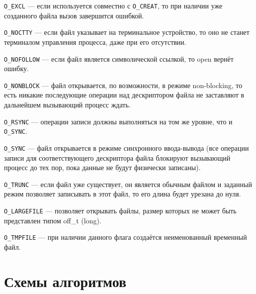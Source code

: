 \documentclass[12pt]{report}
\begin{document}
\texttt{O\_EXCL} --- если используется совместно с \texttt{O\_CREAT}, то при наличии уже созданного файла вызов завершится ошибкой.

\texttt{O\_NOCTTY} --- если файл указывает на терминальное устройство, то оно не станет терминалом управления процесса, даже при его отсутствии.

\texttt{O\_NOFOLLOW} --- если файл является символической ссылкой, то open вернёт ошибку.

\texttt{O\_NONBLOCK} --- файл открывается, по возможности, в режиме non-blocking, то есть никакие последующие операции над дескриптором файла не заставляют в дальнейшем вызывающий процесс ждать.

\texttt{O\_RSYNC} --- операции записи должны выполняться на том же уровне, что и \texttt{O\_SYNC}.

\texttt{O\_SYNC} --- файл открывается в режиме синхронного ввода-вывода (все операции записи для соответствующего дескриптора файла блокируют вызывающий процесс до тех пор, пока данные не будут физически записаны).

\texttt{O\_TRUNC} --- если файл уже существует, он является обычным файлом и заданный режим позволяет записывать в этот файл, то его длина будет урезана до нуля.

\texttt{O\_LARGEFILE} --- позволяет открывать файлы, размер которых не может быть представлен типом off\_t (long).

\texttt{O\_TMPFILE} --- при наличии данного флага создаётся неименованный временный файл.

\chapter{Схемы алгоритмов}
\end{document}
